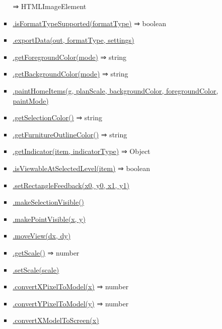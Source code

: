 \documentclass[a4paper]{report}
\begin{document}
\begin{itemize}
\begin{itemize}
\begin{itemize}
      ⇒ HTMLImageElement
    \item
      \protect\hyperlink{PlanComponent+isFormatTypeSupported}{.isFormatTypeSupported(formatType)}
      ⇒ boolean
    \item
      \protect\hyperlink{PlanComponent+exportData}{.exportData(out,
      formatType, settings)}
    \item
      \protect\hyperlink{PlanComponent+getForegroundColor}{.getForegroundColor(mode)}
      ⇒ string
    \item
      \protect\hyperlink{PlanComponent+getBackgroundColor}{.getBackgroundColor(mode)}
      ⇒ string
    \item
      \protect\hyperlink{PlanComponent+paintHomeItems}{.paintHomeItems(g,
      planScale, backgroundColor, foregroundColor, paintMode)}
    \item
      \protect\hyperlink{PlanComponent+getSelectionColor}{.getSelectionColor()}
      ⇒ string
    \item
      \protect\hyperlink{PlanComponent+getFurnitureOutlineColor}{.getFurnitureOutlineColor()}
      ⇒ string
    \item
      \protect\hyperlink{PlanComponent+getIndicator}{.getIndicator(item,
      indicatorType)} ⇒ Object
    \item
      \protect\hyperlink{PlanComponent+isViewableAtSelectedLevel}{.isViewableAtSelectedLevel(item)}
      ⇒ boolean
    \item
      \protect\hyperlink{PlanComponent+setRectangleFeedback}{.setRectangleFeedback(x0,
      y0, x1, y1)}
    \item
      \protect\hyperlink{PlanComponent+makeSelectionVisible}{.makeSelectionVisible()}
    \item
      \protect\hyperlink{PlanComponent+makePointVisible}{.makePointVisible(x,
      y)}
    \item
      \protect\hyperlink{PlanComponent+moveView}{.moveView(dx, dy)}
    \item
      \protect\hyperlink{PlanComponent+getScale}{.getScale()} ⇒ number
    \item
      \protect\hyperlink{PlanComponent+setScale}{.setScale(scale)}
    \item
      \protect\hyperlink{PlanComponent+convertXPixelToModel}{.convertXPixelToModel(x)}
      ⇒ number
    \item
      \protect\hyperlink{PlanComponent+convertYPixelToModel}{.convertYPixelToModel(y)}
      ⇒ number
    \item
      \protect\hyperlink{PlanComponent+convertXModelToScreen}{.convertXModelToScreen(x)}

\end{itemize}
\end{itemize}
\end{itemize}
\end{document}
